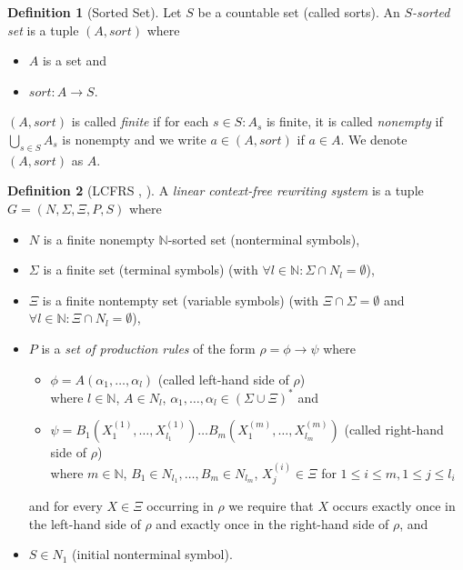 \documentclass{tudscrartcl}
\theoremstyle{definition}
\newtheorem{definition}{Definition}[section]
\begin{document}
\begin{definition}[Sorted Set]
	Let $S$ be a countable set (called sorts).
	An \emph{$S$-sorted set} is a tuple $(A, sort)$ where
	\begin{itemize}
		\item $A$ is a set and
		\item $sort: A \to S$.
	\end{itemize}
	$(A, sort)$ is called \emph{finite} if for each $s \in S: A_s$ is finite,
	it is called \emph{nonempty} if $\bigcup_{s \in S}A_s$ is nonempty
	and we write $a \in (A, sort)$ if $a \in A$.
	We denote $(A, sort)$ as $A$.
\end{definition}

\begin{definition}[LCFRS \cite{vshanker87}, \cite{kallmeyer12}]
	A \emph{linear context-free rewriting system} is a tuple
	$G =(N, \Sigma, \Xi, P, S)$ where
	\begin{itemize}
		\item $N$ is a finite nonempty $\mathbb{N}$-sorted set (nonterminal symbols),
		\item $\Sigma$ is a finite set (terminal symbols)
			(with $\forall l \in \mathbb{N}: \Sigma \cap N_l = \emptyset$),
		\item $\Xi$ is a finite nontempty set (variable symbols)
			(with $\Xi \cap \Sigma = \emptyset$ and
			$\forall l \in \mathbb{N}: \Xi \cap N_l = \emptyset$),
		\item $P$ is a \emph{set of production rules}
			of the form $\rho = \phi \to \psi$ where
			\begin{itemize}
				\item $\phi = A(\alpha_1, \ldots, \alpha_l)$
					(called left-hand side of $\rho$)\\
					where $l \in \mathbb{N}$, $A \in N_l$,
					$\alpha_1, \ldots, \alpha_l \in (\Sigma \cup \Xi)^*$ and
				\item $\psi = B_1(X^{(1)}_1, \ldots, X^{(1)}_{l_1})
					\ldots B_m(X^{(m)}_1, \ldots, X^{(m)}_{l_m})$
					(called right-hand side of $\rho$)\\
					where $m \in \mathbb{N}$, $B_1 \in N_{l_1}, \ldots, B_m \in N_{l_m}$,
					$X^{(i)}_{j} \in \Xi$ for $1 \leq i \leq m, 1 \leq j \leq l_i$
			\end{itemize}
			and for every $X \in \Xi$ occurring in $\rho$ we require that $X$ occurs
			exactly once in the left-hand side of $\rho$ and
			exactly once in the right-hand side of $\rho$, and
		\item $S \in N_1$ (initial nonterminal symbol).

\end{itemize}
\end{definition}
\end{document}
